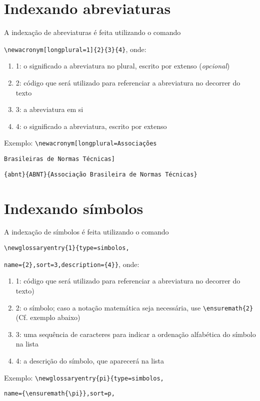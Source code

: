 \documentclass{fei}
\begin{document}
	\section{Indexando abreviaturas}
	
	A indexação de abreviaturas é feita utilizando o comando
	
	\verb+\newacronym[longplural=1]{2}{3}{4}+, onde:
	
	\begin{enumerate}
	\item 1: o significado a abreviatura no plural, escrito por extenso (\emph{opcional})
	\item 2: código que será utilizado para referenciar a abreviatura no decorrer do texto
	\item 3: a abreviatura em si
	\item 4: o significado a abreviatura, escrito por extenso
	\end{enumerate}
	
	Exemplo: \verb+\newacronym[longplural=Associações+
	
			 \verb+Brasileiras de Normas Técnicas]+
			 
			 \verb+{abnt}{ABNT}{Associação Brasileira de Normas Técnicas}+
			 
	\section{Indexando símbolos}
	
	A indexação de símbolos é feita utilizando o comando
	
	\verb+\newglossaryentry{1}{type=simbolos,+
	
	\verb+name={2},sort=3,description={4}}+, onde:
	
	\begin{enumerate}
	\item 1: código que será utilizado para referenciar a abreviatura no decorrer do texto)
	\item 2: o símbolo; caso a notação matemática seja necessária, use \verb+\ensuremath{2}+ (Cf. exemplo abaixo)
	\item 3: uma sequência de caracteres para indicar a ordenação alfabética do símbolo na lista
	\item 4: a descrição do símbolo, que aparecerá na lista
	\end{enumerate}
	
	Exemplo: \verb+\newglossaryentry{pi}{type=simbolos,+
	
			 \verb+name={\ensuremath{\pi}},sort=p,+
			 
\end{document}
